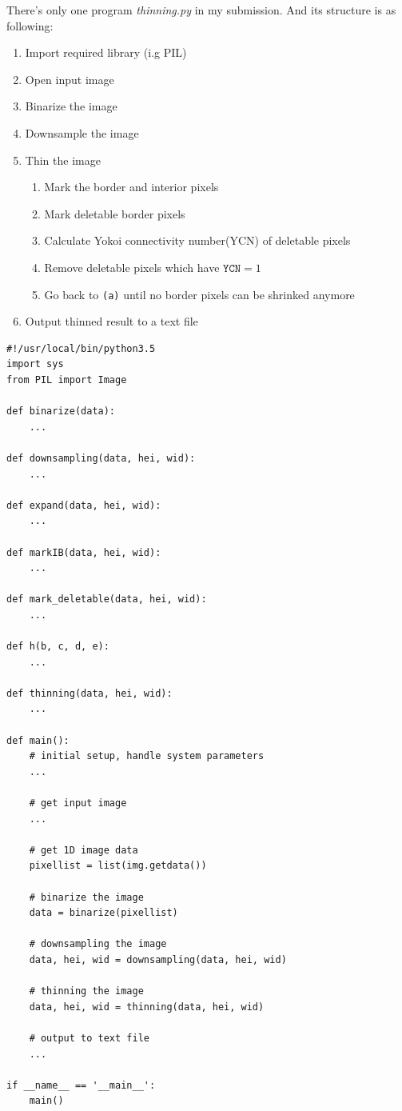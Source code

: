 \documentclass[14pt,a4paper]{extarticle}
\begin{document}
There's only one program \textit{thinning.py} in my submission. And its structure is as following:
\begin{enumerate}
	\item Import required library (i.g PIL)
	\item Open input image
	\item Binarize the image
	\item Downsample the image
	\item Thin the image
		\begin{enumerate}
			\item Mark the border and interior pixels
			\item Mark deletable border pixels
			\item Calculate Yokoi connectivity number(YCN) of deletable pixels
			\item Remove deletable pixels which have $\texttt{YCN} = 1$
			\item Go back to \texttt{(a)} until no border pixels can be shrinked anymore
		\end{enumerate}
	\item Output thinned result to a text file
\end{enumerate}

\begin{lstlisting}
#!/usr/local/bin/python3.5
import sys
from PIL import Image

def binarize(data):
	...

def downsampling(data, hei, wid):
	...

def expand(data, hei, wid):
	...

def markIB(data, hei, wid):
	...

def mark_deletable(data, hei, wid):
	...

def h(b, c, d, e):
	...

def thinning(data, hei, wid):
	...

def main():
	# initial setup, handle system parameters
	...

	# get input image
	...

	# get 1D image data
	pixellist = list(img.getdata())

	# binarize the image
	data = binarize(pixellist)

	# downsampling the image
	data, hei, wid = downsampling(data, hei, wid)

	# thinning the image
	data, hei, wid = thinning(data, hei, wid)

	# output to text file
	...

if __name__ == '__main__':
	main()
\end{lstlisting}
\end{document}
